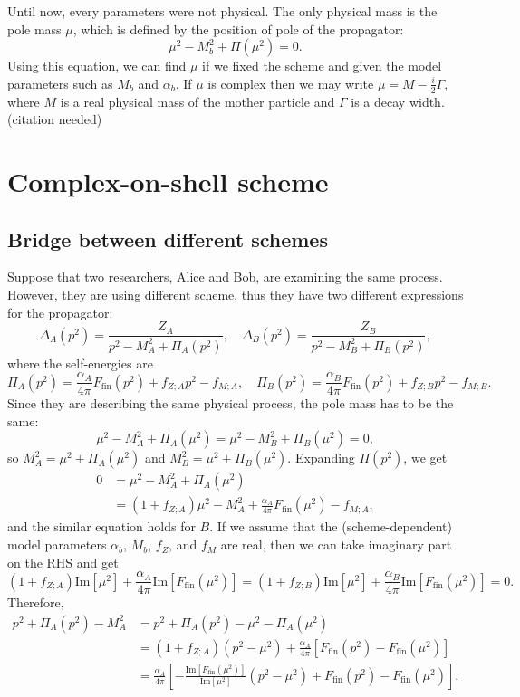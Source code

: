 \documentclass[11pt]{article}
\theoremstyle{definition}
\theoremstyle{remark}
\begin{document}
	Until now, every parameters were not physical.
	The only physical mass is the pole mass $\mu$, which is defined by the position of pole of the propagator:
	\[\mu^{2}-M_{b}^{2}+\Pi(\mu^{2})=0.\]
	Using this equation, we can find $\mu$ if we fixed the scheme and given the model parameters such as $M_{b}$ and $\alpha_{b}$.
	If $\mu$ is complex then we may write $\mu=M-\frac{i}{2}\Gamma$, where $M$ is a real physical mass of the mother particle and $\Gamma$ is a decay width. (citation needed)
	
	\section{Complex-on-shell scheme}
	\subsection{Bridge between different schemes}
	Suppose that two researchers, Alice and Bob, are examining the same process.
	However, they are using different scheme, thus they have two different expressions for the propagator:
	\[\Delta_{A}(p^{2})=\frac{Z_{A}}{p^{2}-M_{A}^{2}+\Pi_{A}(p^{2})},\quad\Delta_{B}(p^{2})=\frac{Z_{B}}{p^{2}-M_{B}^{2}+\Pi_{B}(p^{2})},\]
	where the self-energies are
	\[\Pi_{A}(p^{2})=\frac{\alpha_{A}}{4\pi}F_{\text{fin}}(p^{2})+f_{Z;A}p^{2}-f_{M;A},\quad\Pi_{B}(p^{2})=\frac{\alpha_{B}}{4\pi}F_{\text{fin}}(p^{2})+f_{Z;B}p^{2}-f_{M;B}.\]
	Since they are describing the same physical process, the pole mass has to be the same:
	\[\mu^{2}-M_{A}^{2}+\Pi_{A}(\mu^{2})=\mu^{2}-M_{B}^{2}+\Pi_{B}(\mu^{2})=0,\]
	so $M_{A}^{2}=\mu^{2}+\Pi_{A}(\mu^{2})$ and $M_{B}^{2}=\mu^{2}+\Pi_{B}(\mu^{2})$.
	Expanding $\Pi(p^{2})$, we get
	\begin{align*}
		0&=\mu^{2}-M_{A}^{2}+\Pi_{A}(\mu^{2})\\
		&=(1+f_{Z;A})\mu^{2}-M_{A}^{2}+\frac{\alpha_{A}}{4\pi}F_{\text{fin}}(\mu^{2})-f_{M;A},
	\end{align*}
	and the similar equation holds for $B$.
	If we assume that the (scheme-dependent) model parameters $\alpha_{b}$, $M_{b}$, $f_{Z}$, and $f_{M}$ are real, then we can take imaginary part on the RHS and get
	\[(1+f_{Z;A})\mathrm{Im}[\mu^{2}]+\frac{\alpha_{A}}{4\pi}\mathrm{Im}[F_{\text{fin}}(\mu^{2})]=(1+f_{Z;B})\mathrm{Im}[\mu^{2}]+\frac{\alpha_{B}}{4\pi}\mathrm{Im}[F_{\text{fin}}(\mu^{2})]=0.\]
	Therefore,
	\begin{align*}
		p^{2}+\Pi_{A}(p^{2})-M_{A}^{2}&=p^{2}+\Pi_{A}(p^{2})-\mu^{2}-\Pi_{A}(\mu^{2})\\
		&=(1+f_{Z;A})(p^{2}-\mu^{2})+\frac{\alpha_{A}}{4\pi}[F_{\text{fin}}(p^{2})-F_{\text{fin}}(\mu^{2})]\\
		&=\frac{\alpha_{A}}{4\pi}\left[-\frac{\mathrm{Im}[F_{\text{fin}}(\mu^{2})]}{\mathrm{Im}[\mu^{2}]}(p^{2}-\mu^{2})+F_{\text{fin}}(p^{2})-F_{\text{fin}}(\mu^{2})\right].
	\end{align*}
\end{document}
